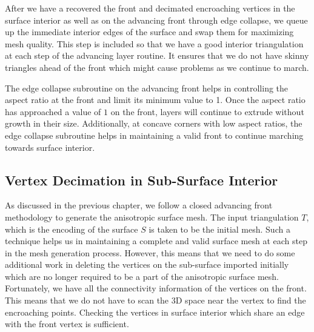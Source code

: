 After we have a recovered the front and decimated encroaching vertices in the surface interior as well as on the advancing front through edge collapse, we queue up the immediate interior edges of the surface and swap them for maximizing mesh quality. This step is included so that we have a good interior triangulation at each step of the advancing layer routine. It ensures that we do not have skinny triangles ahead of the front which might cause problems as we continue to march.

The edge collapse subroutine on the advancing front helps in controlling the aspect ratio at the front and limit its minimum value to 1. Once the aspect ratio has approached a value of $1$ on the front, layers will continue to extrude without growth in their size. Additionally, at concave corners with low aspect ratios, the edge collapse subroutine helps in maintaining a valid front to continue marching towards surface interior.

\subsection{Vertex Decimation in Sub-Surface Interior}

As discussed in the previous chapter, we follow a closed advancing front methodology to generate the anisotropic surface mesh. The input triangulation $T$, which is the encoding of the surface $S$ is taken to be the initial mesh. Such a technique helps us in maintaining a complete and valid surface mesh at each step in the mesh generation process. However, this means that we need to do some additional work in deleting the vertices on the sub-surface imported initially which are no longer required to be a part of the anisotropic surface mesh. Fortunately, we have all the connectivity information of the vertices on the front. This means that we do not have to scan the 3D space near the vertex to find the encroaching points. Checking the vertices in surface interior which share an edge with the front vertex is sufficient.

